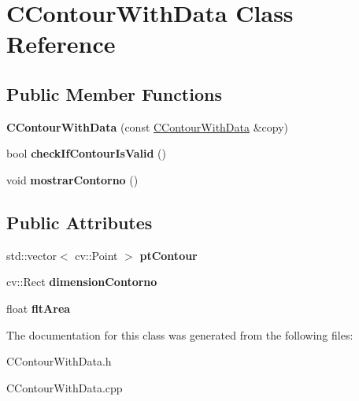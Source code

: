 \hypertarget{classCContourWithData}{}\section{C\+Contour\+With\+Data Class Reference}
\label{classCContourWithData}
\subsection*{Public Member Functions}
\begin{DoxyCompactItemize}
\item 
{\bfseries C\+Contour\+With\+Data} (const \hyperlink{classCContourWithData}{C\+Contour\+With\+Data} \&copy)\hypertarget{classCContourWithData_a756d63b5e03e8809531f13c3231a5c3b}{}\label{classCContourWithData_a756d63b5e03e8809531f13c3231a5c3b}

\item 
bool {\bfseries check\+If\+Contour\+Is\+Valid} ()\hypertarget{classCContourWithData_aee393fc1557ce93c93fa16cba9a0f457}{}\label{classCContourWithData_aee393fc1557ce93c93fa16cba9a0f457}

\item 
void {\bfseries mostrar\+Contorno} ()\hypertarget{classCContourWithData_adc8d62ef51d181ee9bf36b250dc14990}{}\label{classCContourWithData_adc8d62ef51d181ee9bf36b250dc14990}

\end{DoxyCompactItemize}
\subsection*{Public Attributes}
\begin{DoxyCompactItemize}
\item 
std\+::vector$<$ cv\+::\+Point $>$ {\bfseries pt\+Contour}\hypertarget{classCContourWithData_ace345d75058a013dc37f3b020736c383}{}\label{classCContourWithData_ace345d75058a013dc37f3b020736c383}

\item 
cv\+::\+Rect {\bfseries dimension\+Contorno}\hypertarget{classCContourWithData_a42c9ccab08cb833ecfb7f4b2a3d9a371}{}\label{classCContourWithData_a42c9ccab08cb833ecfb7f4b2a3d9a371}

\item 
float {\bfseries flt\+Area}\hypertarget{classCContourWithData_a065c8525870170a4ce67c7428b3c6cff}{}\label{classCContourWithData_a065c8525870170a4ce67c7428b3c6cff}

\end{DoxyCompactItemize}


The documentation for this class was generated from the following files\+:\begin{DoxyCompactItemize}
\item 
C\+Contour\+With\+Data.\+h\item 
C\+Contour\+With\+Data.\+cpp\end{DoxyCompactItemize}
